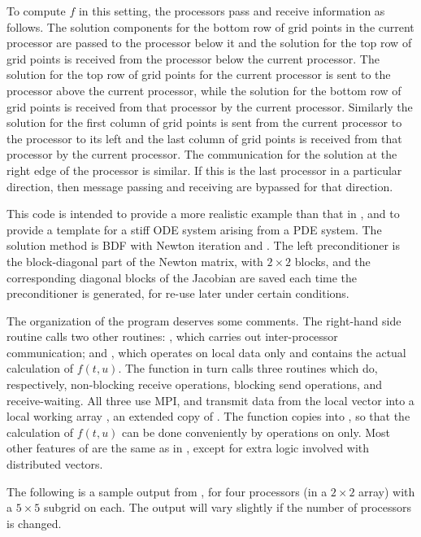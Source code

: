 To compute $f$ in this setting, the processors pass and receive
information as follows.  The solution components for the bottom row of
grid points in the current processor are passed to the processor below
it and the solution for the top row of grid points is received from
the processor below the current processor. The solution for the top
row of grid points for the current processor is sent to the processor
above the current processor, while the solution for the bottom row of
grid points is received from that processor by the current
processor. Similarly the solution for the first column of grid points
is sent from the current processor to the processor to its left and
the last column of grid points is received from that processor by the
current processor. The communication for the solution at the right
edge of the processor is similar. If this is the last processor in a
particular direction, then message passing and receiving are bypassed
for that direction.

This code is intended to provide a more realistic example than that in
, and to provide a template for a stiff ODE system
arising from a PDE system. The solution method is BDF with Newton
iteration and {\spgmr}. The left preconditioner is the block-diagonal
part of the Newton matrix, with $2 \times 2$ blocks, and the
corresponding diagonal blocks of the Jacobian are saved each time the
preconditioner is generated, for re-use later under certain conditions.

The organization of the  program deserves some comments. The
right-hand side routine  calls two other routines: , which
carries out inter-processor communication; and , which operates on
local data only and contains the actual calculation of $f(t,u)$. The
 function in turn calls three routines which do, respectively,
non-blocking receive operations, blocking send operations, and
receive-waiting. All three use MPI, and transmit data from the local 
vector into a local working array , an extended copy of .
The  function copies  into , so that the
calculation of $f(t,u)$ can be done conveniently by operations on
 only.  Most other features of  are the same as
in , except for extra logic involved with distributed
vectors.

The following is a sample output from , for four processors
(in a $2 \times 2$ array) with a $5 \times 5$ subgrid on each.
The output will vary slightly if the number of processors is changed.

